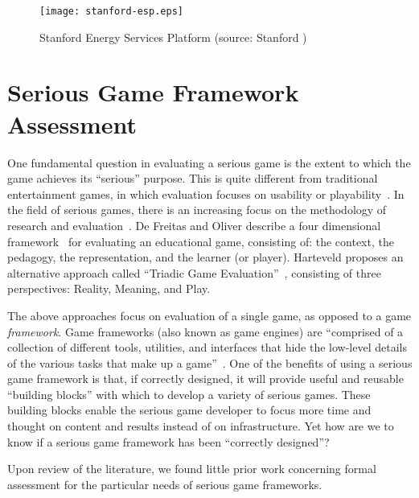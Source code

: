 \begin{figure}[htbp]
	\centering
		\texttt{[image: stanford-esp.eps]}
		\caption{Stanford Energy Services Platform (source: Stanford \cite{Armel-2012})}
		\label{fig:building-dashboard}
\end{figure}

\section{Serious Game Framework Assessment}

One fundamental question in evaluating a serious game is the extent to which the
game achieves its ``serious'' purpose.  This is quite different from 
traditional entertainment games, in which evaluation focuses on usability or
playability~\cite{song2007new}. In the field of serious games, there is an increasing
focus on the methodology of research and evaluation~\cite{Mayer2012233}. De Freitas and
Oliver describe a four dimensional framework~\cite{de2006can} for evaluating an
educational game, consisting of: the context, the pedagogy, the representation, and the
learner (or player). Harteveld proposes an alternative approach called ``Triadic Game
Evaluation''~\cite{harteveld2010triadic}, consisting of three perspectives: Reality,
Meaning, and Play.

The above approaches focus on evaluation of a single game, as opposed to a game {\em
  framework}. Game frameworks (also known as game engines) are ``comprised of a collection
of different tools, utilities, and interfaces that hide the low-level details of the
various tasks that make up a game''~\cite{sherrod2006ultimate}. One of the benefits of
using a serious game framework is that, if correctly designed, it will provide useful and
reusable ``building blocks'' with which to develop a variety of serious games.  These
building blocks enable the serious game developer to focus more time and thought on
content and results instead of on infrastructure. Yet how are we to know if a serious
game framework has been ``correctly designed''?

Upon review of the literature, we found little prior work concerning formal assessment for
the particular needs of serious game frameworks.